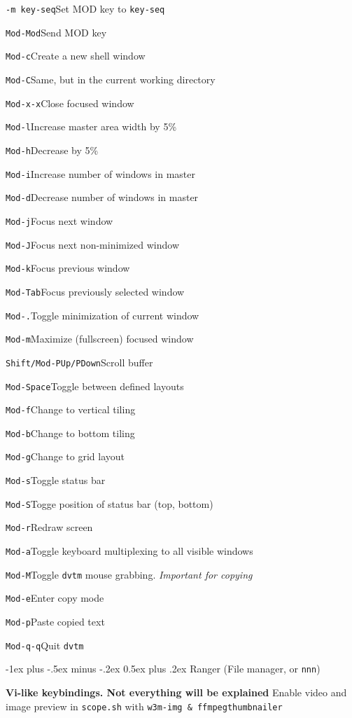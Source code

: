\documentclass[12pt,landscape]{article}
\makeatletter
\renewcommand{\section}{\@startsection{section}{1}{0mm}%
                                {-1ex plus -.5ex minus -.2ex}%
                                {0.5ex plus .2ex}%
                                {\normalfont\large\bfseries}}
\def\cm#1#2{{\tt#1}\dotfill#2\par}
\makeatother
\begin{document}
\begin{multicols}{3}
\cm{-m key-seq}{Set MOD key to \texttt{key-seq}}

\cm{Mod-Mod}{Send MOD key}

\cm{Mod-c}{Create a new shell window}

\cm{Mod-C}{Same, but in the current working directory}

\cm{Mod-x-x}{Close focused window}

\cm{Mod-l}{Increase master area width by 5\%}

\cm{Mod-h}{Decrease by 5\%}

\cm{Mod-i}{Increase number of windows in master}

\cm{Mod-d}{Decrease number of windows in master}

\cm{Mod-j}{Focus next window}

\cm{Mod-J}{Focus next non-minimized window}

\cm{Mod-k}{Focus previous window}

\cm{Mod-Tab}{Focus previously selected window}

\cm{Mod-.}{Toggle minimization of current window}

\cm{Mod-m}{Maximize (fullscreen) focused window}

\cm{Shift/Mod-PUp/PDown}{Scroll buffer}

\cm{Mod-Space}{Toggle between defined layouts}

\cm{Mod-f}{Change to vertical tiling}

\cm{Mod-b}{Change to bottom tiling}

\cm{Mod-g}{Change to grid layout}

\cm{Mod-s}{Toggle status bar}

\cm{Mod-S}{Togge position of status bar (top, bottom)}

\cm{Mod-r}{Redraw screen}

\cm{Mod-a}{Toggle keyboard multiplexing to all visible windows}

\cm{Mod-M}{Toggle \texttt{dvtm} mouse grabbing. \textit{Important for copying}}

\cm{Mod-e}{Enter copy mode}

\cm{Mod-p}{Paste copied text}

\cm{Mod-q-q}{Quit \texttt{dvtm}}

\section{Ranger (File manager, or \texttt{nnn})}

\textbf{Vi-like keybindings. Not everything will be explained} Enable video and image preview in \texttt{scope.sh} with \texttt{w3m-img \& ffmpegthumbnailer}


\end{multicols}
\end{document}
